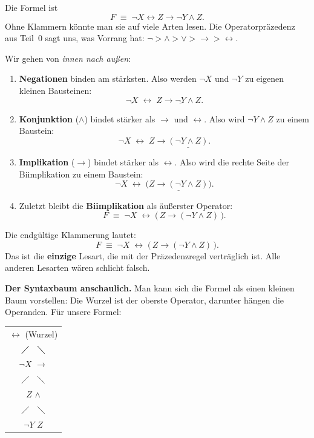 \documentclass[a4paper,12pt]{article}
\begin{document}
Die Formel ist
\[
F \;\equiv\; \neg X \leftrightarrow Z \to \neg Y \wedge Z.
\]
Ohne Klammern k\"onnte man sie auf viele Arten lesen. Die
Operatorpr\"azedenz aus Teil~0 sagt uns, was Vorrang hat:
$\neg > \wedge > \vee > \to > \leftrightarrow$.

Wir gehen von \emph{innen nach au{\ss}en}:

\begin{enumerate}
\item \textbf{Negationen} binden am st\"arksten. Also werden
      $\neg X$ und $\neg Y$ zu eigenen kleinen Bausteinen:
\[
\underline{\neg X} \;\leftrightarrow\; Z \to \underline{\neg Y} \wedge Z.
\]

\item \textbf{Konjunktion} ($\wedge$) bindet st\"arker als
      $\to$ und $\leftrightarrow$. Also wird $\neg Y \wedge Z$ zu
      einem Baustein:
\[
\neg X \;\leftrightarrow\; Z \to \underline{(\neg Y \wedge Z)}.
\]

\item \textbf{Implikation} ($\to$) bindet st\"arker als
      $\leftrightarrow$. Also wird die rechte Seite der
      Biimplikation zu einem Baustein:
\[
\neg X \;\leftrightarrow\; \underline{\bigl(Z \to (\neg Y \wedge Z)\bigr)}.
\]

\item Zuletzt bleibt die \textbf{Biimplikation} als \"au{\ss}erster
      Operator:
\[
F \;\equiv\; \neg X \;\leftrightarrow\; \bigl(\,Z \to (\neg Y \wedge Z)\,\bigr).
\]
\end{enumerate}

\begin{merkbox}
Die endg\"ultige Klammerung lautet:
\[
F \;\equiv\; \neg X \;\leftrightarrow\; \bigl(\,Z \to (\neg Y \wedge Z)\,\bigr).
\]
Das ist die \textbf{einzige} Lesart, die mit der Pr\"azedenzregel
vertr\"aglich ist. Alle anderen Lesarten w\"aren schlicht falsch.
\end{merkbox}

\textbf{Der Syntaxbaum anschaulich.} Man kann sich die Formel als
einen kleinen Baum vorstellen: Die Wurzel ist der oberste Operator,
darunter h\"angen die Operanden. F\"ur unsere Formel:

\begin{center}
\begin{tabular}{c}
$\leftrightarrow$ (Wurzel) \\
$\diagup \quad \diagdown$ \\
$\neg X$ \quad $\to$ \\
\quad\quad\quad $\diagup \quad \diagdown$ \\
\quad\quad\quad $Z$ \quad $\wedge$ \\
\quad\quad\quad\quad\quad\quad $\diagup \quad \diagdown$ \\
\quad\quad\quad\quad\quad\quad $\neg Y$ \quad $Z$ \\
\end{tabular}
\end{center}
\end{document}

